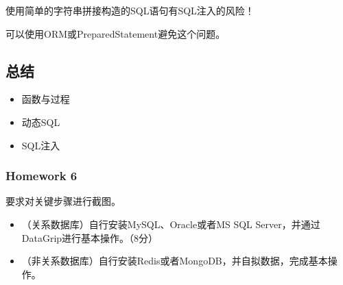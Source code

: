 \documentclass[aspectratio=169, 14pt]{beamer}
\begin{document}
{
\begin{frame}[standout]
使用简单的字符串拼接构造的SQL语句有SQL注入的风险！

可以使用ORM或PreparedStatement避免这个问题。
\end{frame}
}


\begin{frame}[fragile]
    \section{\textcolor{darkmidnightblue}{总结}}

\begin{itemize}
    \item 函数与过程
    \item 动态SQL
    \item SQL注入
\end{itemize}
\end{frame}

\begin{frame}
    \frametitle{Homework 6}
要求对关键步骤进行截图。
    \begin{itemize}
        \item （关系数据库）自行安装MySQL、Oracle或者MS SQL Server，并通过DataGrip进行基本操作。（8分）
        \item （非关系数据库）自行安装Redis或者MongoDB，并自拟数据，完成基本操作。
    \end{itemize}

\end{frame}
\end{document}
